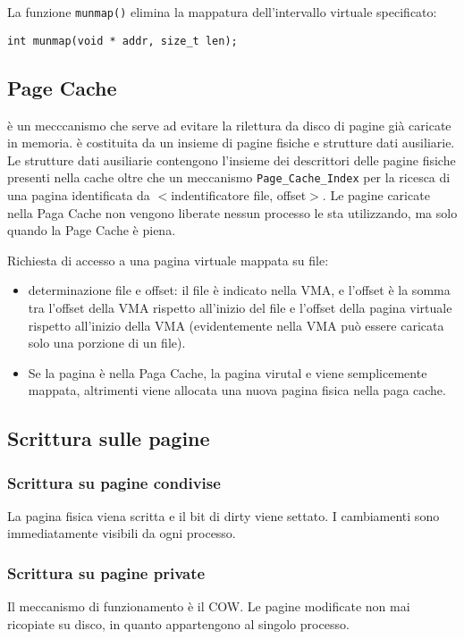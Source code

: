 \documentclass[12pt, a4paper]{report}
\begin{document}
La funzione \texttt{munmap()} elimina la mappatura dell'intervallo virtuale
specificato:
\begin{verbatim}
int munmap(void * addr, size_t len);
\end{verbatim}

\subsection{Page Cache}
è un mecccanismo che serve ad evitare la rilettura da disco di pagine già
caricate in memoria. è costituita da un insieme di pagine fisiche e strutture
dati ausiliarie. Le strutture dati ausiliarie contengono l'insieme dei
descrittori delle pagine fisiche presenti nella cache oltre che un meccanismo
\texttt{Page\_Cache\_Index} per la ricesca di una pagina identificata da
$<$indentificatore file, offset$>$. Le pagine caricate nella Paga Cache non
vengono liberate nessun processo le sta utilizzando, ma solo quando la Page
Cache è piena.

Richiesta di accesso a una pagina virtuale mappata su file:
\begin{itemize}
	\item determinazione file e offset: il file è indicato nella VMA, e
		l'offset è la somma tra l'offset della VMA rispetto all'inizio del file
		e l'offset della pagina virtuale rispetto all'inizio della VMA
		(evidentemente nella VMA può essere caricata solo una porzione di un
		file).
	\item Se la pagina è nella Paga Cache, la pagina virutal e viene
		semplicemente mappata, altrimenti viene allocata una nuova pagina fisica
		nella paga cache.
\end{itemize}

\subsection{Scrittura sulle pagine}
\subsubsection{Scrittura su pagine condivise}
La pagina fisica viena scritta e il bit di dirty viene settato. I cambiamenti
sono immediatamente visibili da ogni processo.
\subsubsection{Scrittura su pagine private}
Il meccanismo di funzionamento è il COW. Le pagine modificate non mai ricopiate
su disco, in quanto appartengono al singolo processo.
\end{document}
